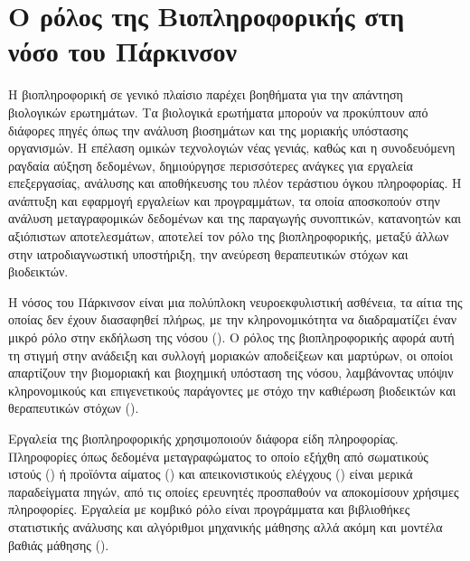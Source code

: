 \documentclass[12pt]{report}
\begin{document}
        \section{Ο ρόλος της Βιοπληροφορικής στη νόσο του Πάρκινσον}
        Η βιοπληροφορική σε γενικό πλαίσιο παρέχει βοηθήματα για την απάντηση βιολογικών ερωτημάτων. Τα βιολογικά ερωτήματα μπορούν να προκύπτουν από διάφορες πηγές όπως την ανάλυση βιοσημάτων και της μοριακής υπόστασης οργανισμών. Η επέλαση ομικών τεχνολογιών νέας γενιάς, καθώς και η συνοδευόμενη ραγδαία αύξηση δεδομένων, δημιούργησε περισσότερες ανάγκες για εργαλεία επεξεργασίας, ανάλυσης και αποθήκευσης του πλέον τεράστιου όγκου πληροφορίας. Η ανάπτυξη και εφαρμογή εργαλείων και προγραμμάτων, τα οποία αποσκοπούν στην ανάλυση μεταγραφομικών δεδομένων και της παραγωγής συνοπτικών, κατανοητών και αξιόπιστων αποτελεσμάτων, αποτελεί τον ρόλο της βιοπληροφορικής, μεταξύ άλλων στην ιατροδιαγνωστική υποστήριξη, την ανεύρεση θεραπευτικών στόχων και βιοδεικτών.
        \par
         H νόσος του Πάρκινσον είναι μια πολύπλοκη νευροεκφυλιστική ασθένεια, τα αίτια της οποίας δεν έχουν διασαφηθεί πλήρως, με την κληρονομικότητα να διαδραματίζει έναν μικρό ρόλο στην εκδήλωση της νόσου (\emph{\cite{Scholz2012GenomicsDisease}}). Ο ρόλος της βιοπληροφορικής αφορά αυτή τη στιγμή στην ανάδειξη και συλλογή μοριακών αποδείξεων και μαρτύρων, οι οποίοι απαρτίζουν την βιομοριακή και βιοχημική υπόσταση της νόσου, λαμβάνοντας υπόψιν κληρονομικούς και επιγενετικούς παράγοντες με στόχο την καθιέρωση βιοδεικτών και θεραπευτικών στόχων (\emph{\cite{Krokidis2019IdentificationAnalysis}}).
         \par
         Εργαλεία της βιοπληροφορικής χρησιμοποιούν διάφορα είδη πληροφορίας. Πληροφορίες όπως δεδομένα μεταγραφώματος το οποίο εξήχθη από σωματικούς ιστούς (\emph{\cite{Planken2017LookingSkin}}) ή προϊόντα αίματος (\emph{\cite{Wang2022BioinformaticsDisease}}) και απεικονιστικούς ελέγχους (\emph{\cite{Salvatore2014MachinePalsy}}) είναι μερικά παραδείγματα πηγών, από τις οποίες ερευνητές προσπαθούν να αποκομίσουν χρήσιμες πληροφορίες. Εργαλεία με κομβικό ρόλο είναι προγράμματα και βιβλιοθήκες στατιστικής ανάλυσης και αλγόριθμοι μηχανικής μάθησης αλλά ακόμη και μοντέλα βαθιάς μάθησης (\emph{\cite{Wang2020EarlyLearning}}).
        
\end{document}
